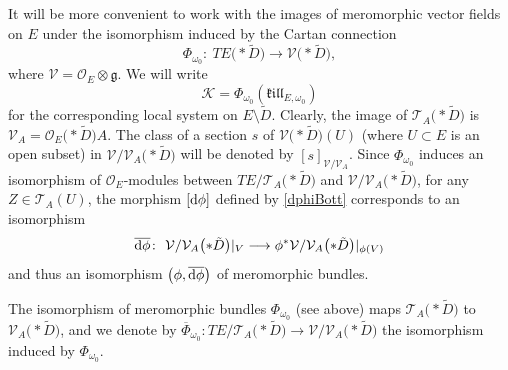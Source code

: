 \documentclass[pdftex]{sigma}
\numberwithin{equation}{section}
\begin{document}
It will be more convenient to work with the images of meromorphic vector fields on $E$ under the isomorphism induced by the Cartan connection
 \begin{equation}\label{Phi}\Phi_{\omega_0}\colon\ TE\bigl(* \tilde{D}\bigr) \longrightarrow \mathcal{V}\bigl(* \tilde{D}\bigr),
 \end{equation}
 where $\mathcal{V}=\mathcal{O}_E\otimes \mathfrak{g}$. We will write
 \begin{equation}\label{K} \mathcal{K} = \Phi_{\omega_0}(\mathfrak{k}\mathfrak{i}\mathfrak{l}\mathfrak{l}_{E,\omega_0}) \end{equation}
 for the corresponding local system on $E\setminus \tilde{D}$. Clearly, the image of $\mathcal{T}_A\bigl(* \tilde{D}\bigr)$ is $\mathcal{V}_A=\mathcal{O}_E\bigl(* \tilde{D}\bigr) A$. The class of a section $s$ of $\mathcal{V}\bigl(* \tilde{D}\bigr)(U)$ (where $U\subset E$ is an open subset) in $\mathcal{V}/\mathcal{V}_A\bigl(* \tilde{D}\bigr)$ will be denoted by $[s]_{\mathcal{V}/\mathcal{V}_A}$. Since $\Phi_{\omega_0}$ induces an isomorphism of $\mathcal{O}_E$-modules between $TE/\mathcal{T}_A\bigl(* \tilde{D}\bigr)$ and $\mathcal{V}/\mathcal{V}_A\bigl(* \tilde{D}\bigr)$, for any $Z\in \mathcal{T}_A(U)$, the morphism $[{\rm d}\phi]$ defined by \eqref{dphiBott} corresponds to an isomorphism
 \begin{gather}\label{dphibarBott}\overline{{\rm d}\phi}\colon\ \mathcal{V}/\mathcal{V}_A\bigl(* \tilde{D}\bigr)\vert_V \longrightarrow \phi^* \mathcal{V}/\mathcal{V}_A\bigl(* \tilde{D}\bigr)\vert_{\phi(V)}
 \end{gather}
 and thus an isomorphism $\big(\phi,\overline{{\rm d}\phi}\big)$ of meromorphic bundles.

The isomorphism of meromorphic bundles $\Phi_{\omega_0}$ (see above) maps $\mathcal{T}_A\bigl(* \tilde{D}\bigr)$ to $\mathcal{V}_A\bigl(* \tilde{D}\bigr)$, and we denote by $\overline{\Phi}_{\omega_0}\colon TE/\mathcal{T}_A\bigl(* \tilde{D}\bigr) \longrightarrow \mathcal{V}/\mathcal{V}_A\bigl(* \tilde{D}\bigr)$ the isomorphism induced by $\Phi_{\omega_0}$. %
\end{document}
